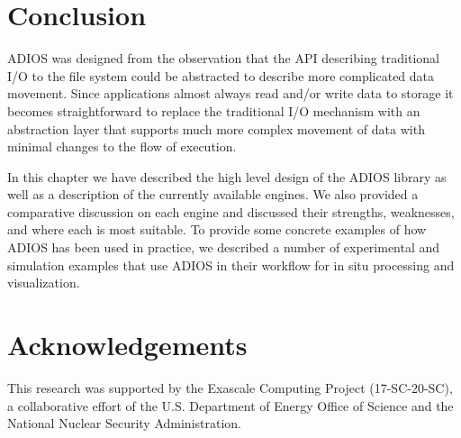\section{Conclusion}
\label{sec:conclusion}

ADIOS was designed from the observation that the API describing traditional I/O to the file system could be abstracted to describe more complicated data movement. 
Since applications almost always read and/or write data to storage it becomes straightforward to replace the traditional I/O mechanism with an abstraction layer that supports much more complex movement of data with minimal changes to the flow of execution.

In this chapter we have described the high level design of the ADIOS library as well as a description of the currently available engines. We also provided a comparative discussion on each engine and discussed their strengths, weaknesses, and where each is most suitable. To provide some concrete examples of how ADIOS has been used in practice, we described a number of experimental and simulation examples that use ADIOS in their workflow for in situ processing and visualization.

\section{Acknowledgements}

This research was supported by the Exascale Computing Project (17-SC-20-SC), a collaborative effort of the U.S. Department of Energy Office of Science and the National Nuclear Security Administration.
